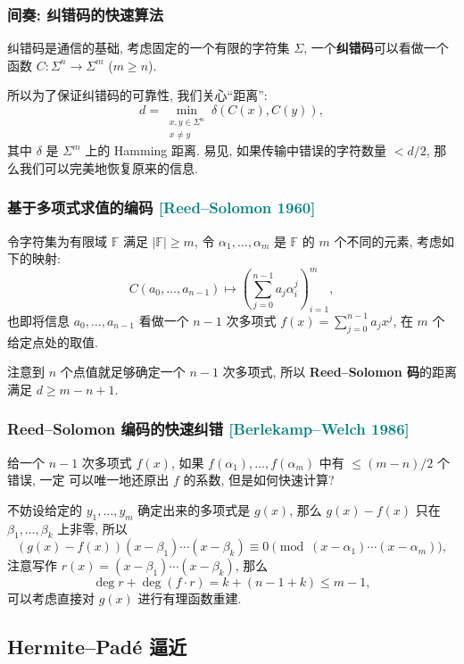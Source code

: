 \documentclass{ctexbeamer}
\newcommand{\cnote}[2][\footnotesize]{\textcolor{teal}{#1[#2]}}
\newcommand{\bbF}{\mathbb F}
\begin{document}
\frame
{
  \frametitle{间奏: 纠错码的快速算法}

  纠错码是通信的基础, 考虑固定的一个有限的字符集 $\Sigma$,
  一个\textbf{纠错码}可以看做一个函数 $C\colon \Sigma^n\to \Sigma^m$ ($m\geq n$).

  所以为了保证纠错码的可靠性, 我们关心``距离'':
  \begin{equation}
    d = \min_{\substack{x,y\in \Sigma^n\\x\neq y}} \delta(C(x), C(y)),
  \end{equation}
  其中 $\delta$ 是 $\Sigma^m$ 上的 Hamming 距离. 易见, 如果传输中错误的字符数量
  $< d/2$, 那么我们可以完美地恢复原来的信息.
}

\frame
{
  \frametitle{基于多项式求值的编码 \cnote{Reed--Solomon 1960}}

  令字符集为有限域 $\bbF$ 满足 $|\bbF| \geq m$, 令 $\alpha_1,\dots, \alpha_m$
  是 $\bbF$ 的 $m$ 个不同的元素, 考虑如下的映射:
  \begin{equation}
    C(a_0,\dots, a_{n-1}) \mapsto \left( \sum_{j=0}^{n-1} a_j \alpha_i^j \right)_{i=1}^m,
  \end{equation}
  也即将信息 $a_0,\dots, a_{n-1}$ 看做一个 $n-1$ 次多项式 $f(x) = \sum_{j=0}^{n-1} a_j x^j$,
  在 $m$ 个给定点处的取值.

  注意到 $n$ 个点值就足够确定一个 $n-1$ 次多项式, 所以 \textbf{Reed--Solomon 码}的距离满足 $d \geq m-n+1$.
}


\frame
{
  \frametitle{Reed--Solomon 编码的快速纠错 \cnote{Berlekamp--Welch 1986}}

  给一个 $n-1$ 次多项式 $f(x)$, 如果 $f(\alpha_1),\dots,f(\alpha_m)$ 中有 $\leq (m-n)/2$ 个错误, 一定
  可以唯一地还原出 $f$ 的系数, 但是如何快速计算?

  \bigskip

  不妨设给定的 $y_1,\dots,y_m$ 确定出来的多项式是 $g(x)$, 那么 $g(x) - f(x)$ 只在 $\beta_1,\dots,\beta_k$
  上非零, 所以
  \begin{equation}
    (g(x) - f(x))(x-\beta_1)\cdots(x-\beta_k) \equiv 0 \pmod {(x-\alpha_1)\cdots(x-\alpha_m)},
  \end{equation}
  注意写作 $r(x) = (x-\beta_1)\cdots(x-\beta_k)$, 那么
  \begin{equation}
    \deg r + \deg (f \cdot r) = k + (n-1+k) \leq m-1,
  \end{equation}
  可以考虑直接对 $g(x)$ 进行有理函数重建.
}

\subsection{Hermite--Pad\'e 逼近}
\end{document}
